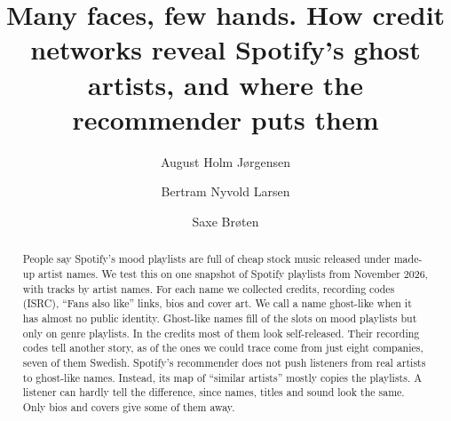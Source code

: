 \documentclass[9pt,twocolumn,twoside]{pnas-new}
\begin{document}
\title{Many faces, few hands. How credit networks reveal Spotify's ghost artists, and where the recommender puts them}

\author[a]{August Holm J{\o}rgensen}
\author[a]{Bertram Nyvold Larsen}
\author[a]{Saxe Br{\o}ten}






\begin{abstract}
People say Spotify's mood playlists are full of cheap stock music released under made-up artist names. We test this on one snapshot of \nPlaylists{} Spotify playlists from November 2026, with \nTracks{} tracks by \nNames{} artist names. For each name we collected credits, recording codes (ISRC), ``Fans also like'' links, bios and cover art. We call a name ghost-like when it has almost no public identity. Ghost-like names fill \slotGhostF{} of the slots on mood playlists but only \slotGhostG{} on genre playlists. In the credits most of them look self-released. Their recording codes tell another story, as \topEightGhostNames{} of the ones we could trace come from just eight companies, seven of them Swedish. Spotify's recommender does not push listeners from real artists to ghost-like names. Instead, its map of ``similar artists'' mostly copies the playlists. A listener can hardly tell the difference, since names, titles and sound look the same. Only bios and covers give some of them away.
\end{abstract}
\end{document}
